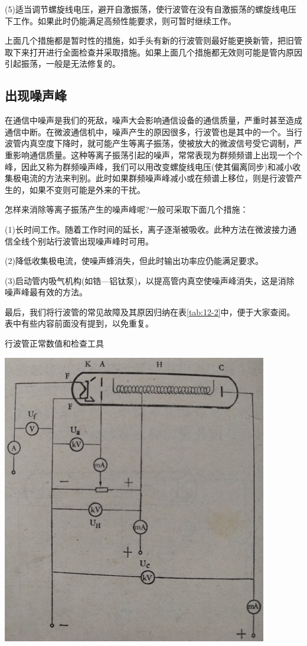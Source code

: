 (5)适当调节螺旋线电压，避开自激振荡，使行波管在没有自激振荡的螺旋线电压下工作。如果此时仍能满足高频性能要求，则可暂时继续工作。

上面几个措施都是暂时性的措施，如手头有新的行波管则最好能更换新管，把旧管取下来打开进行全面检查并采取措施。如果上面几个措施都无效则可能是管内原因引起振荡，一般是无法修复的。
\subsection{出现噪声峰}
在通信中噪声是我们的死敌，噪声大会影响通信设备的通信质量，严重时甚至造成通信中断。在微波通信机中，噪声产生的原因很多，行波管也是其中的一个。当行波管内真空度下降时，就可能产生等离子振荡，使被放大的微波信号受它调制，严重影响通信质量。这种等离子振荡引起的噪声，常常表现为群频频谱上出现一个个峰，因此又称为群频噪声峰，我们可以用改变螺旋线电压(使其偏离同步)和减小收集极电流的方法来判别。此时如果群频噪声峰减小或在频谱上移位，则是行波管产生的，如果不变则可能是外来的干扰。

怎样来消除等离子振荡产生的噪声峰呢?一般可采取下面几个措施：

(1)长时间工作。随着工作时间的延长，离子逐渐被吸收。此种方法在微波接力通信全线个别站行波管出现噪声峰时可用。

(2)降低收集极电流，使噪声蜂消失，但此时输出功率应仍能满足要求。

(3)启动管内吸气机构(如锆—铝钛泵)，以提高管内真空使噪声峰消失，这是消除噪声峰最有效的方法。

最后，我们将行波管的常见故障及其原因归纳在表\ref{tab:12-2}中，便于大家查阅。表中有些内容前面没有提到，以免重复。

\begin{table}
	\centering
	\caption{行波管正常数值和检查工具}
	\label{tab:12-2}
\includegraphics[width=0.52\linewidth]{figure/ch11-24}
\end{table}

